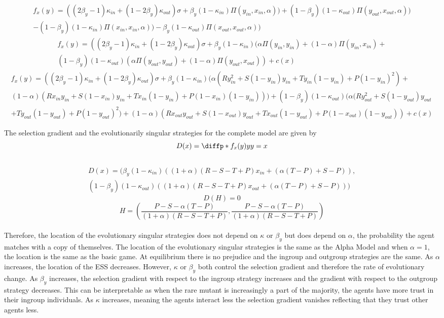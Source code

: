 \documentclass[]{llncs}
\begin{document}
\begin{multline}
f_x(y) = ((2\beta_y-1)\kappa_{in} + (1-2\beta_y)\kappa_{out}) \sigma + \beta_y(1-\kappa_{in})\Pi ( y_{in}, x_{in}, \alpha)) + (1-\beta_y)(1-\kappa_{out})\Pi ( y_{out}, x_{out}, \alpha)) \\- (1-\beta_y)(1-\kappa_{in})\Pi ( x_{in}, x_{in}, \alpha)) - \beta_y(1-\kappa_{out})\Pi ( x_{out}, x_{out}, \alpha))
\end{multline}
\begin{multline}
f_x(y) = ((2\beta_y-1)\kappa_{in} + (1-2\beta_y)\kappa_{out}) \sigma + \beta_y(1-\kappa_{in})(\alpha\Pi(y_{in},y_{in}) + (1-\alpha)\Pi(y_{in},x_{in}) + \\(1-\beta_y)(1-\kappa_{out})(\alpha\Pi(y_{out},y_{out}) + (1-\alpha)\Pi(y_{out},x_{out}))+ c(x)
\end{multline}
\begin{multline}
f_x(y) = ((2\beta_y-1)\kappa_{in} + (1-2\beta_y)\kappa_{out}) \sigma + \beta_y(1-\kappa_{in})(\alpha(R y_{in}^2 + S (1-y_{in}) y_{in} +  T y_{in}(1-y_{in}) + P (1-y_{in})^2) + \\(1-\alpha)(R x_{in} y_{in} + S (1-x_{in}) y_{in} +  T x _{in}(1-y_{in}) + P (1-x_{in}) (1-y_{in}))) + (1-\beta_y)(1-\kappa_{out})(\alpha(R y_{out}^2 + S (1-y_{out}) y_{out} \\+  T y_{out}(1-y_{out})+ P (1-y_{out})^2)  + (1-\alpha)(R x_{out} y_{out} + S (1-x_{out}) y_{out} +  T x _{out}(1-y_{out}) + P (1-x_{out}) (1-y_{out}))+ c(x)
\end{multline}

The selection gradient and the evolutionarily singular strategies for the complete model are given by
\[
D(x) = \diffp*{f_x(y)}{y}{y=x}
\]
\\
\begin{multline}
D(x) = (\beta_y(1-\kappa_{in})((1+\alpha)(R - S - T + P) x_{in} + (\alpha(T-P)+S-P)),\\ (1-\beta_y)(1-\kappa_{out})((1+\alpha)(R - S - T + P) x_{out} + (\alpha(T-P)+S-P)))
\end{multline}
\[
D(H) = 0
\]
\[
H = (\frac{P-S-\alpha(T-P)}{(1+\alpha)(R - S - T + P)}, \frac{P-S-\alpha(T-P)}{(1+\alpha)(R - S - T + P)}) 
\]
\\
Therefore, the location of the evolutionary singular strategies does not depend on $\kappa$ or $\beta_y$ but does depend on $\alpha$, the probability the agent matches with a copy of themselves. The location of the evolutionary singular strategies is the same as the Alpha Model and when $\alpha=1$, the location is the same as the basic game.  At equilibrium there is no prejudice and the ingroup and outgroup strategies are the same. As $\alpha$ increases, the location of the ESS decreases.  However,  $\kappa$ or $\beta_y$ both control the selection gradient and therefore the rate of evolutionary change. As $\beta_y$ increases, the selection gradient with respect to the ingroup strategy increases and the gradient with respect to the outgroup strategy decreases. This can be interpretable as when the rare mutant is increasingly a part of the majority, the agents have more trust in their ingroup individuals. As $\kappa$ increases, meaning the agents interact less the selection gradient vanishes reflecting that they trust other agents less. 
\end{document}
